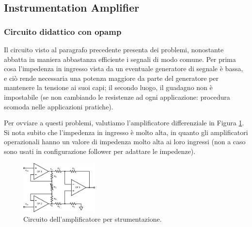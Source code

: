 \subsection{Instrumentation Amplifier}

\subsubsection*{Circuito didattico con opamp}



Il circuito visto al paragrafo precedente presenta dei problemi, nonostante abbatta in maniera abbastanza efficiente i segnali di modo comune. Per prima cosa l'impedenza in ingresso vista da un eventuale generatore di segnale è bassa, e ciò rende necessaria una potenza maggiore da parte del generatore per mantenere la tensione ai suoi capi; il secondo luogo, il guadagno non è impostabile (se non cambiando le resistenze ad ogni applicazione: procedura scomoda nelle applicazioni pratiche).

Per ovviare a questi problemi, valutiamo l'amplificatore differenziale in Figura \ref{cir5:instr_amplif}. Si nota subito che l'impedenza in ingresso è molto alta, in quanto gli amplificatori operazionali hanno un valore di impedenza molto alta ai loro ingressi (non a caso sono usati in configurazione follower per adattare le impedenze).

\begin{figure}
  \begin{center}
    \includegraphics[width=0.350\textwidth]{../E05/latex/c_INA.pdf}
  \end{center}
  \caption{Circuito dell'amplificatore per strumentazione.}
  \label{cir5:instr_amplif}
\end{figure}


